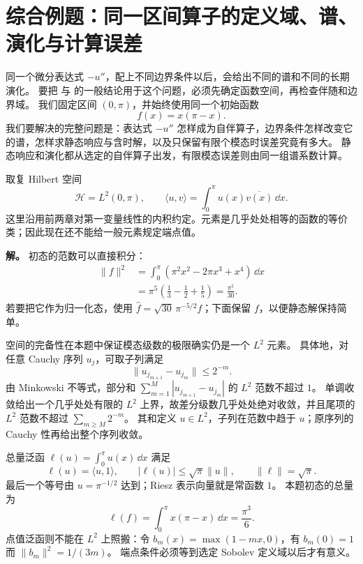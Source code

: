 \section{综合例题：同一区间算子的定义域、谱、演化与计算误差}
\label{sec:ms-interval-spectral-comprehensive}

同一个微分表达式 $-u''$，配上不同边界条件以后，会给出不同的谱和不同的长期演化。
要把 与 的一般结论用于这个问题，必须先确定函数空间，再检查伴随和边界域。
我们固定区间 $(0,\pi)$，并始终使用同一个初始函数
\[
 f(x)=x(\pi-x).
\]
我们要解决的完整问题是：表达式 $-u''$ 怎样成为自伴算子，边界条件怎样改变它的谱，怎样求静态响应与含时解，以及只保留有限个模态时误差究竟有多大。
静态响应和演化都从选定的自伴算子出发，有限模态误差则由同一组谱系数计算。

\begin{exbox}
取复 Hilbert 空间
\[
 \mathcal H=L^2(0,\pi),\qquad
 \langle u,v\rangle=\int_0^\pi u(x)\overline{v(x)}\,\dd x.
\]
这里沿用前两章对第一变量线性的内积约定。元素是几乎处处相等的函数的等价类；因此现在还不能给一般元素规定端点值。

\textbf{解。} 初态的范数可以直接积分：
\begin{align*}
 \|f\|^2
 &=\int_0^\pi (\pi^2x^2-2\pi x^3+x^4)\,\dd x\\
 &=\pi^5\left(\frac13-\frac12+\frac15\right)
 =\frac{\pi^5}{30}.
\end{align*}
若要把它作为归一化态，使用 $\widehat f=\sqrt{30}\,\pi^{-5/2}f$；下面保留 $f$，以便静态解保持简单。

空间的完备性在本题中保证模态级数的极限确实仍是一个 $L^2$ 元素。
具体地，对任意 Cauchy 序列 $u_j$，可取子列满足
\[
 \|u_{j_{m+1}}-u_{j_m}\|\le 2^{-m}.
\]
由 Minkowski 不等式，部分和 $\sum_{m=1}^M|u_{j_{m+1}}-u_{j_m}|$ 的 $L^2$ 范数不超过 $1$。
单调收敛给出一个几乎处处有限的 $L^2$ 上界，故差分级数几乎处处绝对收敛，并且尾项的 $L^2$ 范数不超过 $\sum_{m\ge M}2^{-m}$。
其和定义 $u\in L^2$，子列在范数中趋于 $u$；原序列的 Cauchy 性再给出整个序列收敛。

总量泛函 $\ell(u)=\int_0^\pi u(x)\,\dd x$ 满足
\[
 \ell(u)=\langle u,1\rangle,\qquad
 |\ell(u)|\le\sqrt\pi\|u\|,\qquad \|\ell\|=\sqrt\pi.
\]
最后一个等号由 $u=\pi^{-1/2}$ 达到；Riesz 表示向量就是常函数 $1$。
本题初态的总量为
\[
 \ell(f)=\int_0^\pi x(\pi-x)\,\dd x=\frac{\pi^3}{6}.
\]
点值泛函则不能在 $L^2$ 上照搬：令 $b_m(x)=\max(1-mx,0)$，有 $b_m(0)=1$ 而 $\|b_m\|^2=1/(3m)$。
端点条件必须等到选定 Sobolev 定义域以后才有意义。
\end{exbox}

